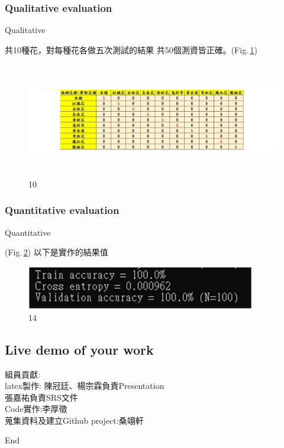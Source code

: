 \documentclass{beamer}
\begin{document}
\subsubsection{Qualitative evaluation}
\begin{frame}{Qualitative}
\begin{CJK}{UTF8}{bkai}
\small 共10種花，對每種花各做五次測試的結果 共50個測資皆正確。(Fig.\,\ref{fig:10})
 \end{CJK}
 \begin{figure}
    \includegraphics[width=12cm,height=5cm]{qualitative.jpg}
    \caption{10}
    \label{fig:10}
  \end{figure}
\end{frame}




\subsubsection{Quantitative evaluation}
\begin{frame}{Quantitative}

\begin{CJK}{UTF8}{bkai}
(Fig.\,\ref{fig:14})  
以下是實作的結果值
 \end{CJK}
 \begin{figure}
    \includegraphics[width=10cm]{Qauntitative.png}
    \caption{14}
    \label{fig:14}
  \end{figure}

\end{frame}

\subsection{Live demo of your work}

\begin{frame}
\begin{CJK}{UTF8}{bkai}
組員貢獻:\\
latex製作:
陳冠廷、楊宗霖負責Presentation\\
張嘉祐負責SRS文件\\
Code實作:李厚徵\\
蒐集資料及建立Github project:桑翊軒
 \end{CJK}
\end{frame}

\begin{frame}
\center \huge End
\end{frame}
\end{document}
